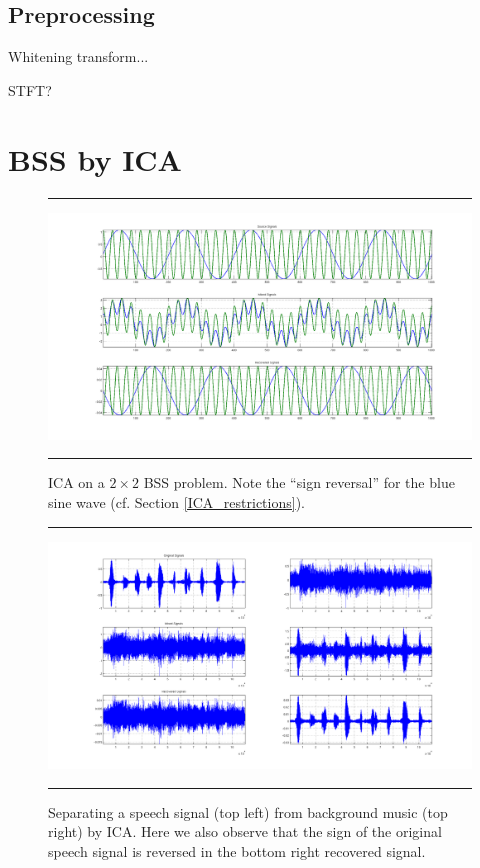 \documentclass[11pt, oneside, a4paper]{report}
\begin{document}
\subsection{Preprocessing}\label{ica_preprocessing}

Whitening transform...

STFT?

\section{BSS by ICA}\label{BSS_ICA}


\begin{figure}
  \centering
  \hrule
  \includegraphics[width = .9\textwidth]{Figures/ica_simple}
  \hrule
  \caption{ICA on a $2\times 2$ BSS problem. Note the ``sign reversal'' for the blue sine wave (cf. Section \ref{ICA_restrictions}).}
\end{figure}

\begin{figure}
  \centering
  \hrule
  \includegraphics[width = .9\textwidth]{Figures/ica_music_speech}
  \hrule
  \caption{Separating a speech signal (top left) from background music (top right) by ICA. Here we also observe that the sign of the original speech signal is reversed in the bottom right recovered signal. }
\end{figure}
\end{document}
